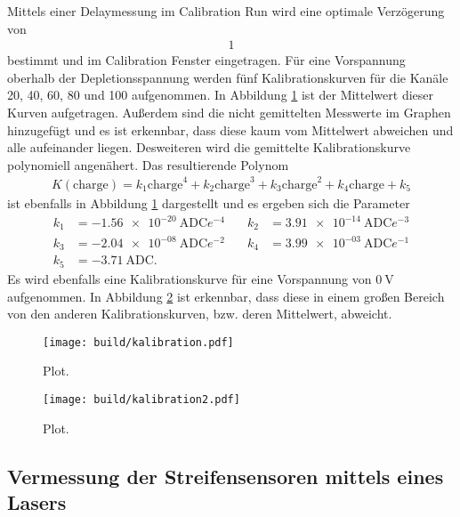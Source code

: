 Mittels einer Delaymessung im Calibration Run wird eine optimale Verzögerung von
\begin{align}
  1
\end{align}
bestimmt und im Calibration Fenster eingetragen. Für eine Vorspannung oberhalb der
Depletionsspannung werden fünf Kalibrationskurven für die Kanäle 20, 40, 60, 80 und 100 aufgenommen. In Abbildung \ref{fig:kalibration}
ist der Mittelwert dieser Kurven aufgetragen. Außerdem sind die nicht gemittelten
Messwerte im Graphen hinzugefügt und es ist erkennbar, dass diese kaum vom Mittelwert abweichen und
alle aufeinander liegen. Desweiteren wird die gemittelte Kalibrationskurve polynomiell angenähert.
Das resultierende Polynom
\begin{align}
  K(\text{charge}) = k_1 \text{charge}^4 + k_2 \text{charge}^3 + k_3 \text{charge}^2 + k_4 \text{charge} + k_5
  \label{eqn:kalibrationspolynom}
\end{align}
ist ebenfalls in Abbildung \ref{fig:kalibration} dargestellt und es ergeben sich die Parameter
\begin{align*}
  k_1 &= \SI{-1.56e-20}{\text{ADC}e^{-4}} &\quad k_2 &= \SI{3.91e-14}{\text{ADC}e^{-3}} \\
  k_3 &= \SI{-2.04e-08}{\text{ADC}e^{-2}} &\quad k_4 &= \SI{3.99e-03}{\text{ADC}e^{-1}} \\
  k_5 &= \SI{-3.71}{\text{ADC}}. &\quad \phantom{f}&\phantom{=10}
\end{align*}
Es wird ebenfalls eine Kalibrationskurve für eine Vorspannung von $\SI{0}{\volt}$ aufgenommen. In Abbildung
\ref{fig:kalibration2} ist erkennbar, dass diese in einem großen Bereich von den anderen Kalibrationskurven,
bzw. deren Mittelwert, abweicht.

\begin{figure}
  \centering
  \texttt{[image: build/kalibration.pdf]}
  \caption{Plot.}
  \label{fig:kalibration}
\end{figure}

\begin{figure}
  \centering
  \texttt{[image: build/kalibration2.pdf]}
  \caption{Plot.}
  \label{fig:kalibration2}
\end{figure}

\subsection{Vermessung der Streifensensoren mittels eines Lasers}

